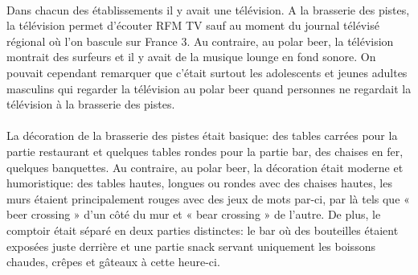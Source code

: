 \paragraph{} Dans chacun des établissements il y avait une télévision. A la
brasserie des pistes, la télévision permet d'écouter RFM TV sauf au moment du
journal télévisé régional où l'on bascule sur France 3. Au contraire, au polar
beer, la télévision montrait des surfeurs et il y avait de la musique lounge en
fond sonore. On pouvait cependant remarquer que c'était surtout les adolescents
et jeunes adultes masculins qui regarder la télévision au polar beer quand
personnes ne regardait la télévision à la brasserie des pistes.

\paragraph{} La décoration de la brasserie des pistes était basique: des tables
carrées pour la partie restaurant et quelques tables rondes pour la partie bar,
des chaises en fer, quelques banquettes. Au contraire, au polar beer, la
décoration était moderne et humoristique: des tables hautes, longues ou rondes
avec des chaises hautes, les murs étaient principalement rouges avec des jeux
de mots par-ci, par là tels que « beer crossing » d'un côté du mur et « bear
crossing » de l'autre. De plus, le comptoir était séparé en deux parties
distinctes: le bar où des bouteilles étaient exposées juste derrière et une
partie snack servant uniquement les boissons chaudes, crêpes et gâteaux à cette
heure-ci.

